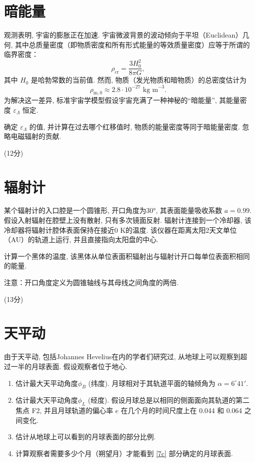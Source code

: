 \documentclass[a4paper,fontset=fandol]{ctexart}
\newcommand{\points}[1]{\par %
	\noindent %
	\hfill (#1分)%
	\vspace{1em}
	}
\begin{document}
	\vspace{1em}
	\section{暗能量}
	
	观测表明, 宇宙的膨胀正在加速. 宇宙微波背景的波动倾向于平坦（Euclidean）几何, 其中总质量密度（即物质密度和所有形式能量的等效质量密度）应等于所谓的临界密度：
	\[ \rho_\mathrm{cr} = \dfrac{3H_0^2}{8\pi G}, \]
	其中 \( H_0 \) 是哈勃常数的当前值. 然而, 物质（发光物质和暗物质）的总密度估计为
	\[ \rho_\mathrm{m,0} \approx 2.8 \cdot 10^{-27} \text{ kg m}^{-3}. \]
	为解决这一差异, 标准宇宙学模型假设宇宙充满了一种神秘的“暗能量”, 其能量密度 \( \varepsilon_\Lambda \) 恒定. 
	
	确定 \( \varepsilon_\Lambda \) 的值, 并计算在过去哪个红移值时, 物质的能量密度等同于暗能量密度. 忽略电磁辐射的贡献. 
	
	\points{12}
	
	\section{辐射计}
	
	某个辐射计的入口腔是一个圆锥形, 开口角度为30°, 其表面能量吸收系数 \( a = 0.99 \). 假设入射辐射在腔壁上没有散射, 只有多次镜面反射. 辐射计连接到一个冷却器, 该冷却器将辐射计腔体表面保持在接近0 K的温度. 该仪器在距离太阳2天文单位（AU）的轨道上运行, 并且直接指向太阳盘的中心. 
	
	计算一个黑体的温度, 该黑体从单位表面积辐射出与辐射计开口每单位表面积相同的能量. 
	
	注意：开口角度定义为圆锥轴线与其母线之间角度的两倍. 
	
	\points{13}
	
	\section{天平动}
	
	由于天平动, 包括Johannes Hevelius在内的学者们研究过, 从地球上可以观察到超过一半的月球表面. 假设观察者位于地心. 
	
	\begin{enumerate}[label=(\alph*)]
		\item 估计最大天平动角度$\phi_B$ (纬度). 月球相对于其轨道平面的轴倾角为 $\alpha = 6^\circ 41'$. 
		
		\item 估计最大天平动角度$\phi_L$ (经度). 假设月球总是以相同的侧面面向其轨道的第二焦点 F2, 并且月球轨道的偏心率 $e$ 在几个月的时间尺度上在 0.044 和 0.064 之间变化. 
		
		\item 估计从地球上可以看到的月球表面的部分比例. \label{7c}
		
		\item 计算观察者需要多少个月（朔望月）才能看到 \ref{7c} 部分确定的月球表面. 
	\end{enumerate}
	
\end{document}
